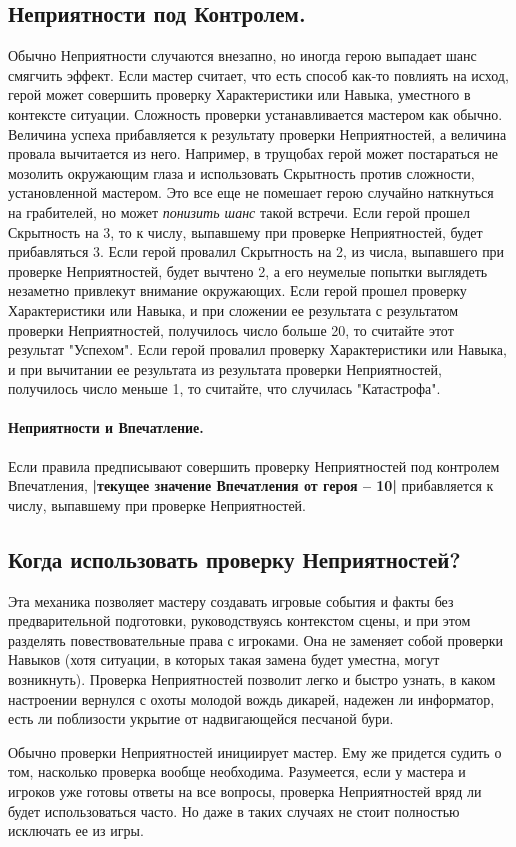 \subsection{Неприятности под Контролем.}
Обычно Неприятности случаются внезапно, но иногда герою выпадает шанс смягчить эффект. Если мастер считает, что есть способ как-то повлиять на исход, герой может совершить проверку Характеристики или Навыка, уместного в контексте ситуации. Сложность проверки устанавливается мастером как обычно. Величина успеха прибавляется к результату проверки Неприятностей, а величина провала вычитается из него. %
\newline Например, в трущобах герой может постараться не мозолить окружающим глаза и использовать Скрытность против сложности, установленной мастером. Это все еще не помешает герою случайно наткнуться на грабителей, но может \textit{понизить шанс} такой встречи. Если герой прошел Скрытность на 3, то к числу, выпавшему при проверке Неприятностей, будет прибавляться 3. Если герой провалил Скрытность на 2, из числа, выпавшего при проверке Неприятностей, будет вычтено 2, а его неумелые попытки выглядеть незаметно привлекут внимание окружающих.
\newline Если герой прошел проверку Характеристики или Навыка, и при сложении ее результата с результатом проверки Неприятностей, получилось число больше 20, то считайте этот результат "Успехом". Если герой провалил проверку Характеристики или Навыка, и при вычитании ее результата из результата проверки Неприятностей, получилось число меньше 1, то считайте, что случилась "Катастрофа".
\paragraph{Неприятности и Впечатление.} Если правила предписывают совершить проверку Неприятностей под контролем Впечатления, \textbf{|текущее значение Впечатления от героя – 10|} прибавляется к числу, выпавшему при проверке Неприятностей.

\subsection{Когда использовать проверку Неприятностей?}
Эта механика позволяет мастеру создавать игровые события и факты без предварительной подготовки, руководствуясь контекстом сцены, и при этом разделять повествовательные права с игроками. Она не заменяет собой проверки Навыков (хотя ситуации, в которых такая замена будет уместна, могут возникнуть). Проверка Неприятностей позволит легко и быстро узнать, в каком настроении вернулся с охоты молодой вождь дикарей, надежен ли информатор, есть ли поблизости укрытие от надвигающейся песчаной бури. 

\begin{tcolorbox}
    Обычно проверки Неприятностей инициирует мастер. Ему же придется судить о том, насколько проверка вообще необходима. Разумеется, если у мастера и игроков уже готовы ответы на все вопросы, проверка Неприятностей вряд ли будет использоваться часто. Но даже в таких случаях не стоит полностью исключать ее из игры.
\end{tcolorbox}
